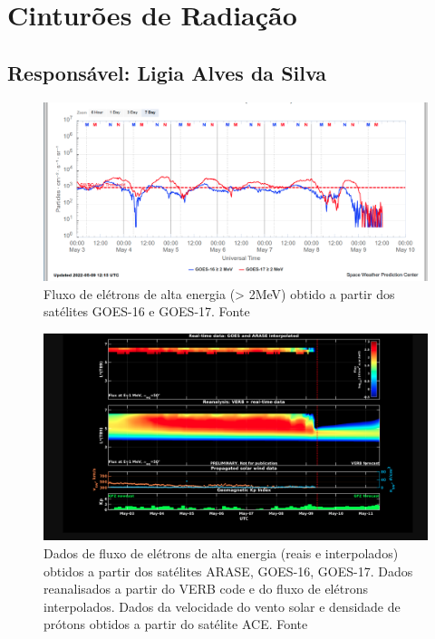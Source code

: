 \documentclass[a4paper, 10pt]{article}
\begin{document}
\section{Cinturões de Radiação} 
 \subsection{Responsável: Ligia Alves da Silva} 
 
\begin{figure}[H]
    
                        \centering
   
                             \includegraphics[width=14cm]{./figures//figureRadBelts_0.png}

                             \caption{ Fluxo de elétrons de alta energia (> 2MeV) obtido a partir dos satélites GOES-16 e GOES-17. Fonte}
                        \end{figure}

                     \begin{figure}[H]
    
                        \centering
   
                             \includegraphics[width=14cm]{./figures//figureRadBelts_1.png}

                             \caption{ Dados de fluxo de elétrons de alta energia (reais e interpolados) obtidos a partir dos satélites ARASE, GOES-16, GOES-17. Dados reanalisados a partir do VERB code e do fluxo de elétrons interpolados. Dados da velocidade do vento solar e densidade de prótons obtidos a partir do satélite ACE. Fonte}
                        \end{figure}
\end{document}
